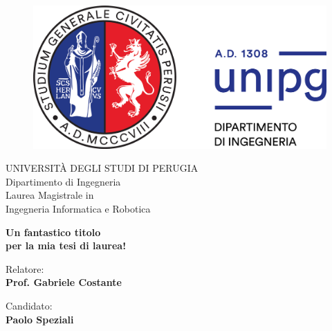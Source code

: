 \begin{titlepage}
\begin{figure}[!htb]
    \centering
    \includegraphics[keepaspectratio=true,scale=0.5]{figures/logounipg2021}
\end{figure}

\begin{center}
    \LARGE{UNIVERSIT\`A DEGLI STUDI DI PERUGIA}
    \vspace{5mm}
    \\ \Large{Dipartimento di Ingegneria}
    \vspace{5mm}
    \\ \LARGE{Laurea Magistrale in \\ Ingegneria Informatica e Robotica}
\end{center}

\vspace{15mm}
\begin{center}
    {\LARGE{\bf Un fantastico titolo\\ \vspace{5mm} per la mia tesi di laurea! }}
    
    
\end{center}
\vspace{30mm}

\begin{minipage}[t]{0.47\textwidth}
	{\large{Relatore:}{\normalsize\vspace{3mm}
	\bf\\ \large{Prof. Gabriele Costante} }} %
\end{minipage}
\hfill
\begin{minipage}[t]{0.47\textwidth}\raggedleft
	{\large{Candidato:}{\normalsize\vspace{3mm} \bf\\ \large{Paolo Speziali}}}
\end{minipage}

\vspace{30mm}
\hrulefill
\\

\end{titlepage}